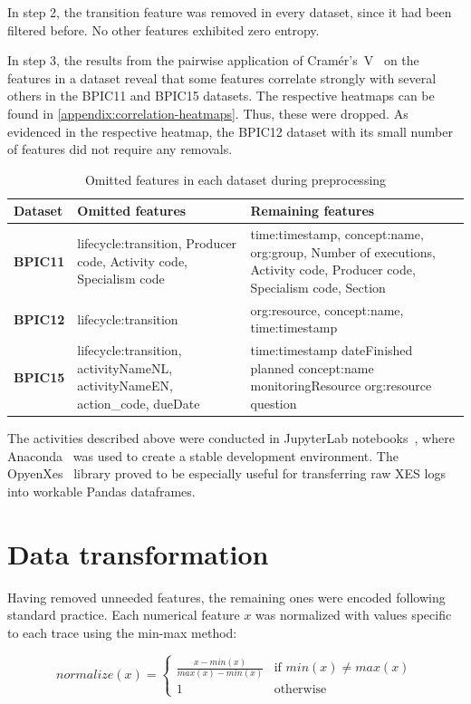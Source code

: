 In step 2, the transition feature was removed in every dataset, since it had been filtered before. No other features exhibited zero entropy.

In step 3, the results from the pairwise application of Cramér's~V~\cite{bergsma2013bias} on the features in a dataset reveal that some features correlate strongly with several others in the BPIC11 and BPIC15 datasets. The respective heatmaps can be found in \autoref{appendix:correlation-heatmaps}. Thus, these were dropped. As evidenced in the respective heatmap, the BPIC12 dataset with its small number of features did not require any removals.

\begin{table}
\centering
\begin{tabular}{lp{4cm}p{5cm}}
\textbf{Dataset} & \textbf{Omitted features} & \textbf{Remaining features}\\
\hline
\textbf{BPIC11} & lifecycle:transition, Producer code, Activity code, Specialism code & time:timestamp, concept:name, org:group, Number of executions, Activity code, Producer code, Specialism code, Section\\
\textbf{BPIC12} & lifecycle:transition & org:resource, concept:name, time:timestamp\\
\textbf{BPIC15} & lifecycle:transition, activityNameNL, activityNameEN, action\_code, dueDate & time:timestamp 	dateFinished 	planned 	concept:name 	monitoringResource 	org:resource 	question
\end{tabular}
\caption{Omitted features in each dataset during preprocessing}
\label{tab:dataset-preprocessing}
\end{table}

The activities described above were conducted in JupyterLab notebooks~\cite{web:jupyter}, where Anaconda~\cite{web:anaconda} was used to create a stable development environment. The OpyenXes~\cite{web:opyenxes} library proved to be especially useful for transferring raw XES logs into workable Pandas dataframes.

\section{Data transformation}
\label{sec:eval:data-transformation}
Having removed unneeded features, the remaining ones were encoded following standard practice. Each numerical feature $x$ was normalized with values specific to each trace using the min-max method:

$$normalize(x) =
\begin{cases}
\frac{x-min(x)}{max(x)-min(x)} & \text{if } min(x) \neq max(x)\\
1 & \text{otherwise}
\end{cases}
$$

